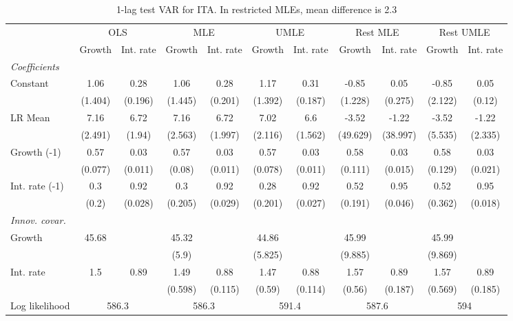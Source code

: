 \begin{table}[htbp] 
	\centering
	\begin{tabular}{@{\extracolsep{4pt}}lcccccccccc@{}}		\hline\hline
		 		 & \multicolumn{2}{c}{OLS} &\multicolumn{2}{c}{MLE} &\multicolumn{2}{c}{UMLE} &\multicolumn{2}{c}{Rest MLE} &\multicolumn{2}{c}{Rest UMLE} \\ 
 		 & Growth 	 & Int. rate 	 & Growth 	 & Int. rate 	 & Growth 	 & Int. rate 	 & Growth 	 & Int. rate 	 & Growth 	 & Int. rate\\\cline{2-3}\cline{4-5}\cline{6-7}\cline{8-9}\cline{10-11}
\rule{0pt}{4ex} 
 \emph{Coefficients} 	  		 & 		 & 		 & 		 & 		 & 		 & 		 & 		 & 		 & 		 &\\ 
\quad Constant 	 & 1.06 	 & 0.28 	 & 1.06 	 & 0.28 	 & 1.17 	 & 0.31 	 & -0.85 	 & 0.05 	 & -0.85 	 & 0.05	 \\ 
 		 & (1.404) 	 & (0.196) 	 & (1.445) 	 & (0.201) 	 & (1.392) 	 & (0.187) 	 & (1.228) 	 & (0.275) 	 & (2.122) 	 & (0.12) 	 \\ 
\quad LR Mean 	 & 7.16 	 & 6.72 	 & 7.16 	 & 6.72 	 & 7.02 	 & 6.6 	 & -3.52 	 & -1.22 	 & -3.52 	 & -1.22	 \\ 
 		 & (2.491) 	 & (1.94) 	 & (2.563) 	 & (1.997) 	 & (2.116) 	 & (1.562) 	 & (49.629) 	 & (38.997) 	 & (5.535) 	 & (2.335) 	 \\ 
\quad Growth (-1) 	 &0.57 	 & 0.03 	 & 0.57 	 & 0.03 	 & 0.57 	 & 0.03 	 & 0.58 	 & 0.03 	 & 0.58 	 & 0.03	 \\ 
 		 & (0.077) 	 & (0.011) 	 & (0.08) 	 & (0.011) 	 & (0.078) 	 & (0.011) 	 & (0.111) 	 & (0.015) 	 & (0.129) 	 & (0.021) 	 \\ 
\quad Int. rate (-1) 	 &0.3 	 & 0.92 	 & 0.3 	 & 0.92 	 & 0.28 	 & 0.92 	 & 0.52 	 & 0.95 	 & 0.52 	 & 0.95	 \\ 
 		 & (0.2) 	 & (0.028) 	 & (0.205) 	 & (0.029) 	 & (0.201) 	 & (0.027) 	 & (0.191) 	 & (0.046) 	 & (0.362) 	 & (0.018) 	 \\ 
\rule{0pt}{4ex} \emph{Innov. covar.}  	 & 	 & 	 & 	 & 	 & 	 & 	 & 	 & 	 & 	 &\\ 
\quad Growth 	 &45.68 	 &  	 & 45.32 	 &  	 & 44.86 	 &  	 & 45.99 	 &  	 & 45.99 	 & 	 \\ 
 		 &  	 &  	 & (5.9) 	 &  	 & (5.825) 	 &  	 & (9.885) 	 &  	 & (9.869) 	 &  	 \\ 
\quad Int. rate 	 &1.5 	 & 0.89 	 & 1.49 	 & 0.88 	 & 1.47 	 & 0.88 	 & 1.57 	 & 0.89 	 & 1.57 	 & 0.89	 \\ 
 		 &  	 &  	 & (0.598) 	 & (0.115) 	 & (0.59) 	 & (0.114) 	 & (0.56) 	 & (0.187) 	 & (0.569) 	 & (0.185) 	 \\ 
 \hline \rule{0pt}{4ex} 
  Log likelihood 	 &\multicolumn{2}{c}{586.3} 	 & \multicolumn{2}{c}{586.3} 	 & \multicolumn{2}{c}{591.4} 	 & \multicolumn{2}{c}{587.6} 	 & \multicolumn{2}{c}{594}\\ 

 \hline 	\end{tabular}		\caption{1-lag test VAR for ITA. In restricted MLEs, mean difference is 2.3}
		\label{tab:ITA1}

\end{table}